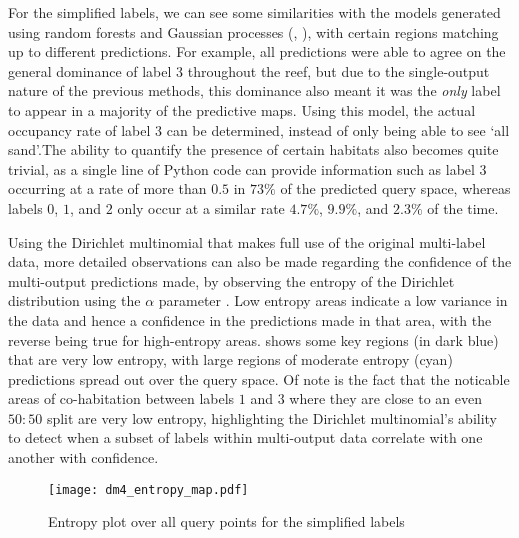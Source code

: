For the simplified labels, we can see some similarities with the models generated using random forests and Gaussian processes (, ),  with certain regions matching up to different predictions. For example, all predictions were able to agree on the general dominance of label 3 throughout the reef, but due to the single-output nature of the previous methods, this dominance also meant it was the \textit{only} label to appear in a majority of the predictive maps. Using this model, the actual occupancy rate of label 3 can be determined, instead of only being able to see `all sand'.The ability to quantify the presence of certain habitats also becomes quite trivial, as a single line of Python code can provide information such as label 3 occurring at a rate of more than $0.5$ in $73\%$ of the predicted query space, whereas labels $0$, $1$, and $2$ only occur at a similar rate $4.7\%$, $9.9\%$, and $2.3\%$ of the time.

Using the Dirichlet multinomial that makes full use of the original multi-label data, more detailed observations can also be made regarding the confidence of the multi-output predictions made, by observing the entropy of the Dirichlet distribution using the $\alpha$ parameter . Low entropy areas indicate a low variance in the data and hence a confidence in the predictions made in that area, with the reverse being true for high-entropy areas.  shows some key regions (in dark blue) that are very low entropy, with large regions of moderate entropy (cyan) predictions spread out over the query space. Of note is the fact that the noticable areas of co-habitation between labels $1$ and $3$ where they are close to an even $50:50$ split are very low entropy, highlighting the Dirichlet multinomial's ability to detect when a subset of labels within multi-output data correlate with one another with confidence.

\begin{figure}[H]
    \begin{minipage}{\linewidth}
        \centerline{\texttt{[image: dm4\_entropy\_map.pdf]}}
        \caption{Entropy plot over all query points for the simplified labels}
        \label{fig:dm4_entropy}
    \end{minipage}
    \hfill
\end{figure}

